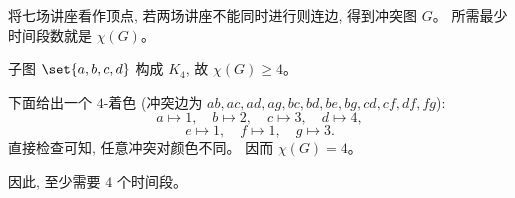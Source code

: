 \documentclass[a4paper, justified]{tufte-handout}
\begin{document}
\begin{solution}
  将七场讲座看作顶点, 若两场讲座不能同时进行则连边, 得到冲突图 $G$。
  所需最少时间段数就是 $\chi(G)$。

  子图 $\set{a,b,c,d}$ 构成 $K_4$, 故 $\chi(G) \ge 4$。

  下面给出一个 $4$-着色 (冲突边为
  $ab, ac, ad, ag, bc, bd, be, bg, cd, cf, df, fg$):
  \[
    a \mapsto 1,\quad b \mapsto 2,\quad c \mapsto 3,\quad d \mapsto 4,
  \]
  \[
    e \mapsto 1,\quad f \mapsto 1,\quad g \mapsto 3.
  \]
  直接检查可知, 任意冲突对颜色不同。
  因而 $\chi(G) = 4$。

  因此, 至少需要 $4$ 个时间段。
\end{solution}
\end{document}
